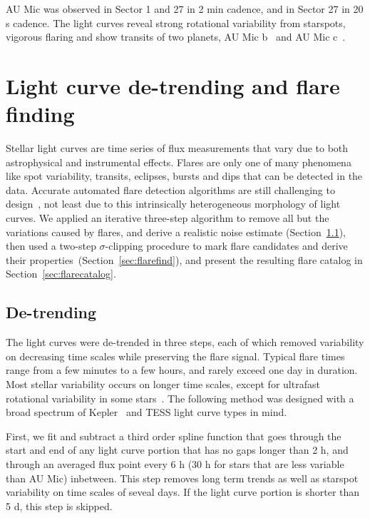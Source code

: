 \documentclass[fleqn,usenatbib,letters]{mnras}%
\begin{document}
AU Mic was observed in Sector 1 and 27 in 2 min cadence, and in Sector 27 in 20 s cadence. The light curves reveal strong rotational variability from starspots, vigorous flaring and show transits of two planets, AU Mic b~\citep{plavchan2020,martioli2021new} and AU Mic c~\citep{martioli2021new}.

\section{Light curve de-trending and flare finding}
\label{sec:detrendfind}
Stellar light curves are time series of flux measurements that vary due to both astrophysical and instrumental effects. Flares are only one of many phenomena like spot variability, transits, eclipses, bursts and dips that can be detected in the data. Accurate automated flare detection algorithms are still challenging to design~\citep{vida2021}, not least due to this intrinsically heterogeneous morphology of light curves. We applied an iterative three-step algorithm to remove all but the variations caused by flares, and derive a realistic noise estimate (Section~\ref{sec:detrend}), then used a two-step $\sigma$-clipping procedure to mark flare candidates and derive their properties~(Section~\ref{sec:flarefind}), and present the resulting flare catalog in Section~\ref{sec:flarecatalog}.

\subsection{De-trending}
\label{sec:detrend}
The light curves were de-trended in three steps, each of which removed variability on decreasing time scales while preserving the flare signal. Typical flare times range from a few minutes to a few hours, and rarely exceed one day in duration. Most stellar variability occurs on longer time scales, except for ultrafast rotational variability in some stars~\citep{ilin2021giant}. The following method was designed with a broad spectrum of Kepler~\citep{borucki2010} and TESS light curve types in mind. %

First, we fit and subtract a third order spline function that goes through the start and end of any light curve portion that has no gaps longer than 2 h, and through an averaged flux point every 6 h (30 h for stars that are less variable than AU Mic) inbetween. This step removes long term trends as well as starspot variability on time scales of seveal days. If the light curve portion is shorter than 5 d, this step is skipped. 
\end{document}
